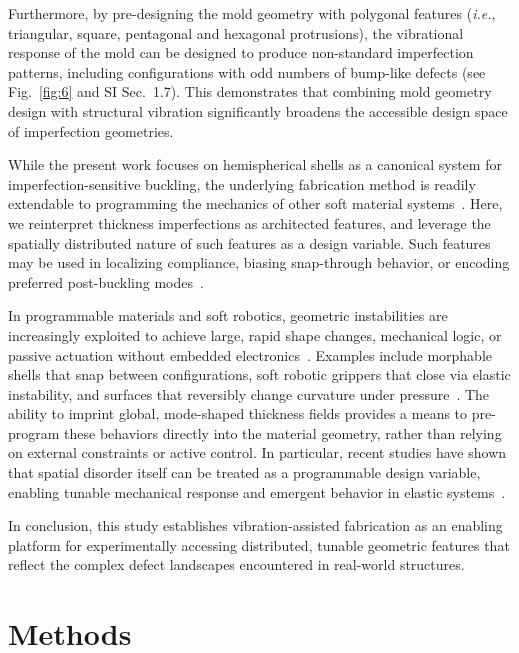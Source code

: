 \documentclass[twocolumn,letter,11pt]{article}
\begin{document}
Furthermore, by pre-designing the mold geometry with polygonal features (\textit{i.e.}, triangular, square, pentagonal and hexagonal protrusions), the vibrational response of the mold can be designed to produce non-standard imperfection patterns, including configurations with odd numbers of bump-like defects (see Fig.~\ref{fig:6} and SI Sec.~1.7). This demonstrates that combining mold geometry design with structural vibration significantly broadens the accessible design space of imperfection geometries.

While the present work focuses on hemispherical shells as a canonical system for imperfection-sensitive buckling, the underlying fabrication method is readily extendable to programming the mechanics of other soft material systems~\cite{skylar2019voxelated,sydney2016biomimetic}. Here, we reinterpret thickness imperfections as architected features, and leverage the spatially distributed nature of such features as a design variable. Such features may be used in localizing compliance, biasing snap-through behavior, or encoding preferred post-buckling modes~\cite{coulais2016combinatorial,florijn2014programmable}.

In programmable materials and soft robotics, geometric instabilities are increasingly exploited to achieve large, rapid shape changes, mechanical logic, or passive actuation without embedded electronics~\cite{shan2015multistable,mosadegh2014pneumatic,overvelde2016three}. Examples include morphable shells that snap between configurations, soft robotic grippers that close via elastic instability, and surfaces that reversibly change curvature under pressure~\cite{klein2007shaping,bende2015geometrically,pezzulla2015morphing}. The ability to imprint global, mode-shaped thickness fields provides a means to pre-program these behaviors directly into the material geometry, rather than relying on external constraints or active control.
In particular, recent studies have shown that spatial disorder itself can be treated as a programmable design variable, enabling tunable mechanical response and emergent behavior in elastic systems~\cite{meeussen2020topological,jones2021bubble,sirote2024emergent}.

In conclusion, this study establishes vibration-assisted fabrication as an enabling platform for experimentally accessing distributed, tunable geometric features that reflect the complex defect landscapes encountered in real-world structures.

\section*{Methods}
\end{document}

